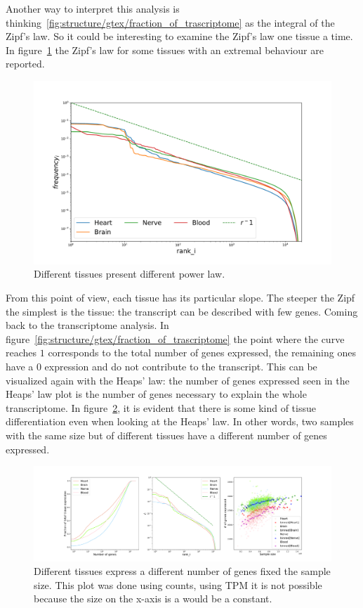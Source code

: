 Another way to interpret this analysis is thinking~\ref{fig:structure/gtex/fraction_of_trascriptome} as the integral of the Zipf's law. So it could be interesting to examine the Zipf's law one tissue a time. In figure~\ref{fig:structure/gtex/zipf_tissue} the Zipf's law for some tissues with an extremal behaviour are reported.
\begin{figure}[htb!]
  \centering
  \includegraphics[width=0.8\linewidth]{pictures/structure/gtex/zipf_tissue.pdf}
  \caption{Different tissues present different power law.}
  \label{fig:structure/gtex/zipf_tissue}
\end{figure}
From this point of view, each tissue has its particular slope. The steeper the Zipf the simplest is the tissue: the transcript can be described with few genes.
\FloatBarrier
Coming back to the transcriptome analysis. In figure~\ref{fig:structure/gtex/fraction_of_trascriptome} the point where the curve reaches $1$ corresponds to the total number of genes expressed, the remaining ones have a $0$ expression and do not contribute to the transcript. This can be visualized again with the Heaps' law: the number of genes expressed seen in the Heaps' law plot is the number of genes necessary to explain the whole transcriptome. In figure~\ref{fig:structure/gtex/heaps_tissue}, it is evident that there is some kind of tissue differentiation even when looking at the Heaps' law. In other words, two samples with the same size but of different tissues have a different number of genes expressed.
\begin{figure}[htb!]
  \centering
  \includegraphics[width=0.5\linewidth]{pictures/structure/gtex/heaps_tissue.pdf}
  \caption{Different tissues express a different number of genes fixed the sample size. This plot was done using counts, using TPM it is not possible because the size on the x-axis is a would be a constant.}
  \label{fig:structure/gtex/heaps_tissue}
\end{figure}
